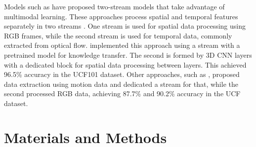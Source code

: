 \documentclass[mathematics,article,submit,pdftex,moreauthors]{Definitions/mdpi}
\begin{document}
Models such as \cite{978301225,8945731,diba2016efficient} have proposed two-stream models that take advantage of multimodal learning. These approaches process spatial and temporal features separately in two streams \cite{8260728, LIU2022864}. One stream is used for spatial data processing using RGB frames, while the second stream is used for temporal data, commonly extracted from optical flow. \cite{978301225} implemented this approach using a stream with a pretrained model for knowledge transfer. The second is formed by 3D CNN layers with a dedicated block for spatial data processing between layers. This achieved 96.5\% accuracy in the UCF101 dataset. Other approaches, such as \cite{8945731,diba2016efficient}, proposed data extraction using motion data and dedicated a stream for that, while the second processed RGB data, achieving 87.7\% \cite{8945731} and 90.2\% \cite{diba2016efficient} accuracy in the UCF dataset.







\section{Materials and Methods}

\end{document}
